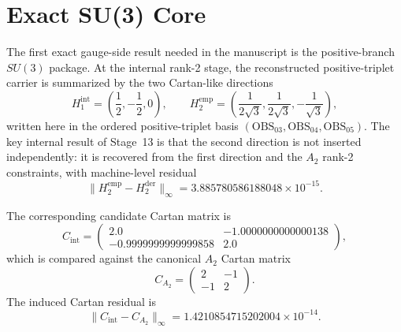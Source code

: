 \documentclass[11pt]{article}
\begin{document}
\section{Exact SU(3) Core}
The first exact gauge-side result needed in the manuscript is the positive-branch $SU(3)$ package. At the internal rank-2 stage, the reconstructed positive-triplet carrier is summarized by the two Cartan-like directions
\begin{equation}
H_1^{\mathrm{int}}
=
\left(
\frac{1}{2},
-\frac{1}{2},
0
\right),
\qquad
H_2^{\mathrm{emp}}
=
\left(
\frac{1}{2\sqrt{3}},
\frac{1}{2\sqrt{3}},
-\frac{1}{\sqrt{3}}
\right),
\label{eq:su3-cartan-pair}
\end{equation}
written here in the ordered positive-triplet basis $(\mathrm{OBS}_{03},\mathrm{OBS}_{04},\mathrm{OBS}_{05})$. The key internal result of Stage~13 is that the second direction is not inserted independently: it is recovered from the first direction and the $A_2$ rank-2 constraints, with machine-level residual
\begin{equation}
\|H_2^{\mathrm{emp}}-H_2^{\mathrm{der}}\|_\infty
=
3.885780586188048\times 10^{-15}.
\label{eq:su3-h2-residual}
\end{equation}

The corresponding candidate Cartan matrix is
\begin{equation}
C_{\mathrm{int}}
=
\begin{pmatrix}
2.0 & -1.0000000000000138\\
-0.9999999999999858 & 2.0
\end{pmatrix},
\label{eq:su3-cartan-candidate}
\end{equation}
which is compared against the canonical $A_2$ Cartan matrix
\begin{equation}
C_{A_2}
=
\begin{pmatrix}
2 & -1\\
-1 & 2
\end{pmatrix}.
\label{eq:su3-cartan-a2}
\end{equation}
The induced Cartan residual is
\begin{equation}
\|C_{\mathrm{int}}-C_{A_2}\|_\infty
=
1.4210854715202004\times 10^{-14}.
\label{eq:su3-cartan-residual}
\end{equation}
\end{document}
